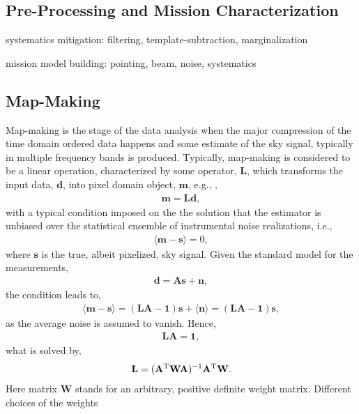 \subsection{Pre-Processing and Mission Characterization}

systematics mitigation: filtering, template-subtraction, marginalization

mission model building: pointing, beam, noise, systematics

\subsection{Map-Making}

Map-making is the stage of the data analysis when the major compression of the time domain ordered data happens and some estimate of the sky signal, typically in multiple frequency bands
is produced. Typically, map-making is considered to be a linear operation, characterized by some operator, $\mathbf{L}$, which transforms the input data, $\mathbf{d}$, into pixel domain object, $\mathbf{m}$, 
e.g., \cite{Tegmark1997},
\begin{eqnarray}
\mathbf{m} = \mathbf{L}\mathbf{d},
\end{eqnarray}
with a typical condition imposed on the the solution that the estimator is unbiased over the statistical ensemble of instrumental noise realizations, i.e.,
\begin{eqnarray}
\langle \mathbf{m} - \mathbf{s}\rangle = 0,
\label{eq:condMaps}
\end{eqnarray}
where $\mathbf{s}$ is the true, albeit pixelized, sky signal.
Given the standard model for the measurements, 
\begin{eqnarray}
\mathbf{d} = \mathbf{A}\mathbf{s} + \mathbf{n},
\end{eqnarray}
the condition leads to,
\begin{eqnarray}
\langle \mathbf{m} - \mathbf{s}\rangle =  (\mathbf{L}\mathbf{A}-\mathbf{1})\mathbf{s} 
+ \langle \mathbf{n} \rangle = (\mathbf{L}\mathbf{A}-\mathbf{1})\mathbf{s},
\end{eqnarray}
as the average noise is assumed to vanish. Hence,
\begin{eqnarray}
\mathbf{L}\mathbf{A} = \mathbf{1},
\end{eqnarray}
what  is solved by,
\begin{eqnarray}
\mathbf{L} = (\mathbf{A}^{\rm T} \mathbf{W} \mathbf{A})^{-1} \mathbf{A}^{\rm T} \mathbf{W}.
\end{eqnarray}
Here matrix $\mathbf{W}$ stands for an arbitrary, positive definite weight matrix. Different choices of the weights
